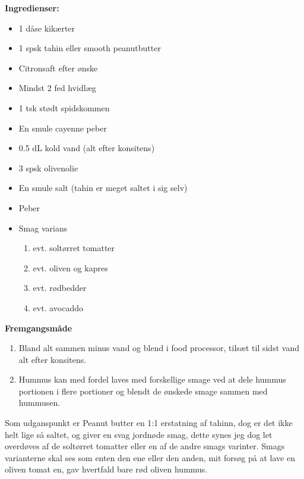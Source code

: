 \documentclass{book}
\begin{document}
\begin{minipage}[t]{0.5\textwidth}
\textbf{Ingredienser:}
\begin{itemize}
    \item 1 dåse kikærter
    \item 1 spsk tahin eller smooth peanutbutter
    \item Citronsaft efter ønske
    \item Mindst 2 fed hvidlæg
    \item 1 tsk stødt spidskommen
    \item En smule cayenne peber
    \item 0.5 dL kold vand (alt efter konsitens)
    \item 3 spsk olivenolie
    \item En smule salt (tahin er meget saltet i sig selv)
    \item Peber
    \item Smag varians
    \begin{enumerate}
        \item evt. soltørret tomatter
        \item evt. oliven og kapres
        \item evt. rødbedder
        \item evt. avocaddo
    \end{enumerate}
\end{itemize}
\end{minipage}
\begin{minipage}[t]{0.5\textwidth}
\textbf{Fremgangsmåde}
\begin{enumerate}
    \item Bland alt sammen minus vand og blend i food processor, tilsæt til sidst vand alt efter konsitens.
    \item Hummus kan med fordel laves med forskellige smage ved at dele hummus portionen i flere portioner og blendt de ønskede smage sammen med hummusen.  
\end{enumerate}
\end{minipage}
Som udganspunkt er Peanut butter en 1:1 erstatning af tahinn, dog er det ikke helt lige så saltet, og giver en svag jordnøde smag, dette synes jeg dog let overdøves af de soltørret tomatter eller en af de andre smags varinter. Smags varianterne skal ses som enten den ene eller den anden, mit forsøg på at lave en oliven tomat en, gav hvertfald bare rød oliven hummus.
\newpage
{}
\end{document}
